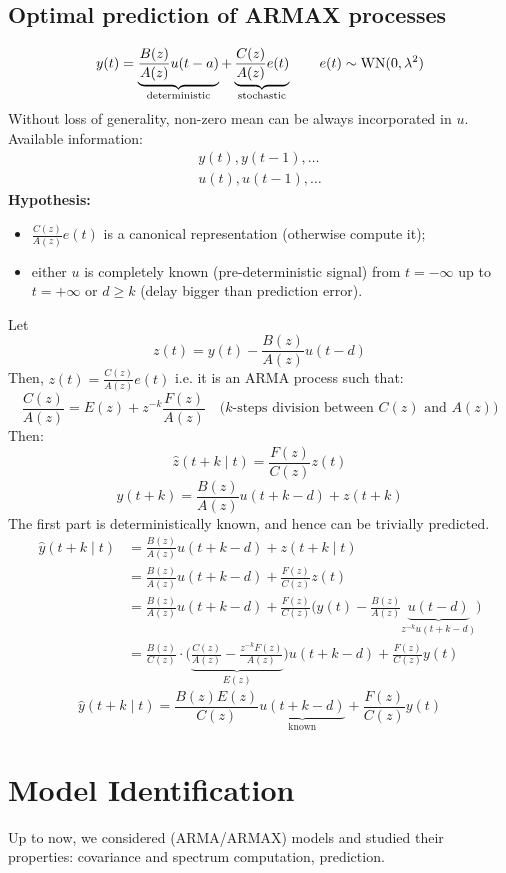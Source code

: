 \section{Optimal prediction of ARMAX processes}

\[
	y(t)=\underbrace{\frac{B(z)}{A(z)} u(t-a)}_{\text{deterministic}}+
	\underbrace{\frac{C(z)}{A(z)} e(t)}_{\text{stochastic}}\qquad e(t)\sim \operatorname{WN}(0,\lambda^2 )
\]
Without loss of generality, non-zero mean can be always incorporated in $u$. Available information:
\begin{gather*}
	y(t),y(t-1),\ldots \\
	u(t),u(t-1),\ldots
\end{gather*}
\textbf{Hypothesis:}
\begin{itemize}
	\item $\frac{C(z)}{A(z)}e(t)$ is a canonical representation (otherwise compute it);
	\item either $u$ is completely known (pre-deterministic signal) from $t=-\infty$ up to $t=+\infty$ or $d\geq k$ (delay bigger than prediction error).
\end{itemize}
Let 
$$
	z(t)=y(t)-\frac{B(z)}{A(z)} u(t-d)
$$
Then, $z(t)=\frac{C(z)}{A(z)} e(t)$ i.e. it is an ARMA process such that:
$$
	\frac{C(z)}{A(z)}=E(z)+z^{-k} \frac{F(z)}{A(z)} \quad\text{($k$-steps division between $C(z)$ and $A(z)$)}
$$
Then:
$$
	\hat{z}(t+k \mid t)=\frac{F(z)}{C(z)} z(t)
$$
$$
	y(t+k)=\frac{B(z)}{A(z)} u(t+k-d)+z(t+k)
$$
The first part is deterministically known, and hence can be trivially predicted.
\begin{align*}
	\hat{y}(t+k \mid t)&=\frac{B(z)}{A(z)} u(t+k-d)+z(t+k \mid t) \\
	&=\frac{B(z)}{A(z)} u(t+k-d)+\frac{F(z)}{C(z)} z(t) \\
	& =\frac{B(z)}{A(z)} u(t+k-d)+\frac{F(z)}{C(z)}\Bigg(y(t)-\frac{B(z)}{A(z)} \underbrace{u(t-d)}_{z^{-k}u(t+k-d)}\Bigg) \\
	&=\frac{B(z)}{C(z)} \cdot\Bigg(\underbrace{\frac{C(z)}{A(z)}-\frac{z^{-k} F(z)}{A(z)}}_{E(z)}\Bigg) u(t+k-d)+\frac{F(z)}{C(z)} y(t)
\end{align*}
$$
	\boxed{\hat{y}(t+k \mid t) =\frac{B(z) E(z)}{C(z)} \underbrace{u(t+k-d)}_{\text{known}}+\frac{F(z)}{C(z)} y(t)}
$$

\chapter{Model Identification}

Up to now, we considered (ARMA/ARMAX) models and studied their properties: covariance and spectrum computation, prediction.

